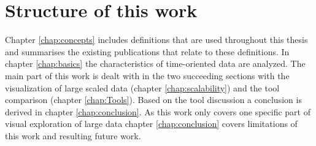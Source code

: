 \section{Structure of this work}
Chapter \ref{chap:concepts} includes definitions that are used throughout this thesis and  summarises the existing publications that relate to these definitions. In chapter \ref{chap:basics} the characteristics of time-oriented data are analyzed. The main part of this work is dealt with in the two succeeding sections with the visualization of large scaled data (chapter \ref{chap:scalability}) and the tool comparison (chapter \ref{chap:Tools}). 
Based on the tool discussion a conclusion is derived in chapter \ref{chap:conclusion}.
As this work only covers one specific part of visual exploration of large data chapter \ref{chap:conclusion} covers limitations of this work and resulting future work.
